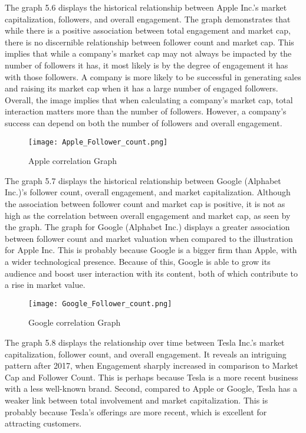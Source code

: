 \documentclass[12pt, a4paper,twoside]{report}
\theoremstyle{plain} %
\theoremstyle{definition} %
\theoremstyle{remark} %
\numberwithin{equation}{chapter}
\begin{document}
    The graph 5.6 displays the historical relationship between Apple Inc.'s market capitalization, followers, and overall engagement. The graph demonstrates that while there is a positive association between total engagement and market cap, there is no discernible relationship between follower count and market cap. This implies that while a company's market cap may not always be impacted by the number of followers it has, it most likely is by the degree of engagement it has with those followers. A company is more likely to be successful in generating sales and raising its market cap when it has a large number of engaged followers. Overall, the image implies that when calculating a company's market cap, total interaction matters more than the number of followers. However, a company's success can depend on both the number of followers and overall engagement.
    \begin{figure}
        \centering
        \texttt{[image: Apple\_Follower\_count.png]}
        \caption{Apple correlation Graph}
        \label{fig:Apple corelation Graph}
    \end{figure}
    
    The graph 5.7 displays the historical relationship between Google (Alphabet Inc.)'s follower count, overall engagement, and market capitalization. Although the association between follower count and market cap is positive, it is not as high as the correlation between overall engagement and market cap, as seen by the graph. The graph for Google (Alphabet Inc.) displays a greater association between follower count and market valuation when compared to the illustration for Apple Inc. This is probably because Google is a bigger firm than Apple, with a wider technological presence. Because of this, Google is able to grow its audience and boost user interaction with its content, both of which contribute to a rise in market value.

    \begin{figure}
        \centering
        \texttt{[image: Google\_Follower\_count.png]}
        \caption{Google correlation Graph}
        \label{fig:Google corelation Graph}
    \end{figure}
    
    The graph 5.8 displays the relationship over time between Tesla Inc.'s market capitalization, follower count, and overall engagement. It reveals an intriguing pattern after 2017, when Engagement sharply increased in comparison to Market Cap and Follower Count.  This is perhaps because Tesla is a more recent business with a less well-known brand. Second, compared to Apple or Google, Tesla has a weaker link between total involvement and market capitalization. This is probably because Tesla's offerings are more recent, which is excellent for attracting customers.
\end{document}
